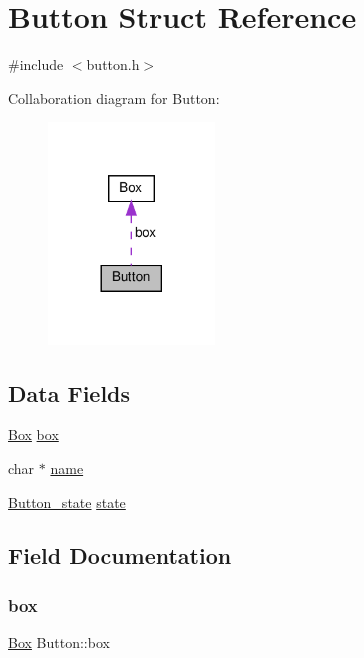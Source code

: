 \hypertarget{structButton}{}\section{Button Struct Reference}
\label{structButton}


{\ttfamily \#include $<$button.\+h$>$}



Collaboration diagram for Button\+:\nopagebreak
\begin{figure}[H]
\begin{center}
\leavevmode
\includegraphics[width=125pt]{structButton__coll__graph}
\end{center}
\end{figure}
\subsection*{Data Fields}
\begin{DoxyCompactItemize}
\item 
\hyperlink{structBox}{Box} \hyperlink{structButton_a0d6f0cb14ea38ae20db8b479a8fce760}{box}
\item 
char $\ast$ \hyperlink{structButton_a78b139339c3b53eb0082803c3b518dad}{name}
\item 
\hyperlink{button_8h_a01cda3effbb71c7c203e4f9716e8844d}{Button\+\_\+state} \hyperlink{structButton_a375398be8d6c20f90febbd0a803b1aec}{state}
\end{DoxyCompactItemize}


\subsection{Field Documentation}
\mbox{\label{structButton_a0d6f0cb14ea38ae20db8b479a8fce760}} 
\subsubsection{\texorpdfstring{box}{box}}
{\footnotesize\ttfamily \hyperlink{structBox}{Box} Button\+::box}

